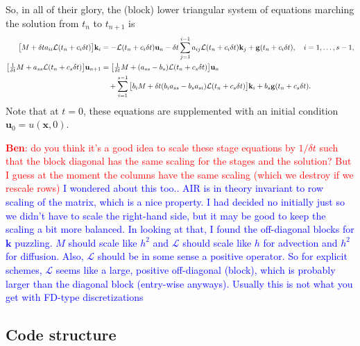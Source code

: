 \documentclass[a4paper,10pt]{article}
\newcommand{\tcb}{\textcolor{blue}}
\begin{document}
So, in all of their glory, the (block) lower triangular system of equations marching the solution from $t_n$ to $t_{n+1}$ is
\begin{align*}
\big[ M + \delta t a_{ii} {\cal L}(t_n + c_i \delta t) \big] \mathbf{k}_i 
&= 
- {\cal L}(t_n + c_i \delta t) \mathbf{u}_{n} 
- \delta t \sum \limits_{j = 1}^{i-1} a_{ij} {\cal L}(t_n + c_i \delta t) \mathbf{k}_{j} 
+ \mathbf{g}(t_n + c_i \delta t),
\quad
i = 1,\ldots,s-1, \\
\big[ 
\tfrac{1}{\delta t} M + a_{ss} {\cal L}(t_n + c_s \delta t) 
\big] 
\mathbf{u}_{n+1} 
&= 
\big[ 
\tfrac{1}{\delta t} M + ( a_{ss} - b_s) {\cal L}(t_n + c_s \delta t) 
\big] 
\mathbf{u}_{n} \\
&\quad
+ \sum \limits_{i = 1}^{s-1} 
\big[
b_i M + \delta t  (b_i a_{ss} - b_s a_{si}) {\cal L}(t_n + c_s \delta t)
\big] \mathbf{k}_i
+
b_s \mathbf{g}(t_n + c_s \delta t).
\end{align*}
Note that at $t = 0$, these equations are supplemented with an initial condition $\mathbf{u}_0 = u(\mathbf{x},0)$.

\textcolor{red}{\textbf{Ben}: do you think it's a good idea to scale these stage equations by $1/\delta t$ such that the block diagonal has the same scaling for the stages and the solution? But I guess at the moment the columns have the same scaling (which we destroy if we rescale rows)}
\tcb{I wondered about this too.. AIR is in theory invariant to row scaling of the matrix, which is a nice property. I
had decided no initially just so we didn't have to scale the right-hand side, but it may be good to keep the scaling
a bit more balanced. 
In looking at that, I found the off-diagonal blocks for $\mathbf{k}$ puzzling. $M$ should scale like $h^2$ and 
$\mathcal{L}$ should scale like $h$ for advection and $h^2$ for diffusion. Also, $\mathcal{L}$ should be in some
sense a positive operator. So for explicit schemes, $\mathcal{L}$ seems like a large, positive off-diagonal (block), which is
probably larger than the diagonal block (entry-wise anyways). Usually this is not what you get with FD-type
discretizations}


\subsection{Code structure}
\end{document}
